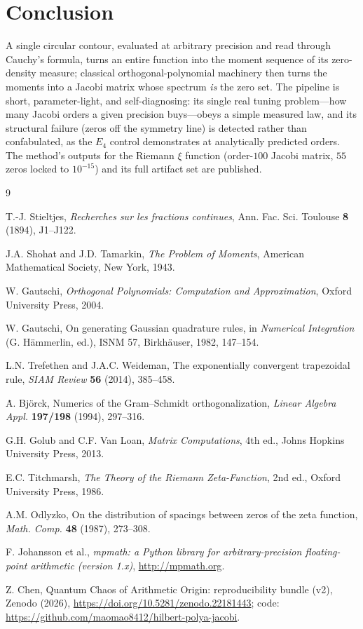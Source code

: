 \documentclass[11pt]{article}
\theoremstyle{definition}
\begin{document}
\section{Conclusion}

A single circular contour, evaluated at arbitrary precision and read
through Cauchy's formula, turns an entire function into the moment
sequence of its zero-density measure; classical orthogonal-polynomial
machinery then turns the moments into a Jacobi matrix whose spectrum
\emph{is} the zero set. The pipeline is short, parameter-light, and
self-diagnosing: its single real tuning problem---how many Jacobi
orders a given precision buys---obeys a simple measured law, and its
structural failure (zeros off the symmetry line) is detected rather
than confabulated, as the $E_4$ control demonstrates at
analytically predicted orders. The method's outputs for the Riemann
$\xi$ function (order-$100$ Jacobi matrix, $55$ zeros locked to
$10^{-15}$) and its full artifact set are published.

\begin{thebibliography}{9}

T.-J. Stieltjes, \emph{Recherches sur les fractions continues},
Ann. Fac. Sci. Toulouse \textbf{8} (1894), J1--J122.

J.A. Shohat and J.D. Tamarkin, \emph{The Problem of Moments},
American Mathematical Society, New York, 1943.

W. Gautschi, \emph{Orthogonal Polynomials: Computation and
Approximation}, Oxford University Press, 2004.

W. Gautschi, On generating Gaussian quadrature rules, in
\emph{Numerical Integration} (G. H\"ammerlin, ed.), ISNM 57,
Birkh\"auser, 1982, 147--154.

L.N. Trefethen and J.A.C. Weideman, The exponentially convergent
trapezoidal rule, \emph{SIAM Review} \textbf{56} (2014), 385--458.

\.A. Bj\"orck, Numerics of the Gram--Schmidt orthogonalization,
\emph{Linear Algebra Appl.} \textbf{197/198} (1994), 297--316.

G.H. Golub and C.F. Van Loan, \emph{Matrix Computations}, 4th ed.,
Johns Hopkins University Press, 2013.

E.C. Titchmarsh, \emph{The Theory of the Riemann Zeta-Function},
2nd ed., Oxford University Press, 1986.

A.M. Odlyzko, On the distribution of spacings between zeros of the
zeta function, \emph{Math. Comp.} \textbf{48} (1987), 273--308.

F. Johansson et al., \emph{mpmath: a Python library for
arbitrary-precision floating-point arithmetic (version 1.x)},
\url{http://mpmath.org}.

Z. Chen, Quantum Chaos of Arithmetic Origin: reproducibility bundle
(v2), Zenodo (2026), \url{https://doi.org/10.5281/zenodo.22181443};
code: \url{https://github.com/maomao8412/hilbert-polya-jacobi}.

\end{thebibliography}
\end{document}
